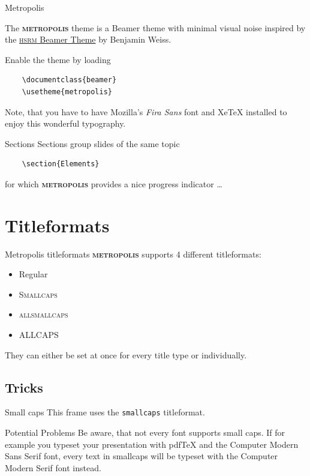 \documentclass[10pt]{beamer}
\newcommand{\themename}{\textbf{\textsc{metropolis}}\xspace}
\begin{document}
\begin{frame}[fragile]{Metropolis}

  The \themename theme is a Beamer theme with minimal visual noise
  inspired by the \href{https://github.com/hsrmbeamertheme/hsrmbeamertheme}{\textsc{hsrm} Beamer
  Theme} by Benjamin Weiss.

  Enable the theme by loading

  \begin{verbatim}    \documentclass{beamer}
    \usetheme{metropolis}\end{verbatim}

  Note, that you have to have Mozilla's \emph{Fira Sans} font and XeTeX
  installed to enjoy this wonderful typography.
\end{frame}
\begin{frame}[fragile]{Sections}
  Sections group slides of the same topic

  \begin{verbatim}    \section{Elements}\end{verbatim}

  for which \themename provides a nice progress indicator \ldots
  
\end{frame}

\section{Titleformats}

\begin{frame}{Metropolis titleformats}
	\themename supports 4 different titleformats:
	\begin{itemize}
		\item Regular
		\item \textsc{Smallcaps}
		\item \textsc{allsmallcaps}
		\item ALLCAPS
	\end{itemize}
	They can either be set at once for every title type or individually.
\end{frame}

\subsection{Tricks}

{
\begin{frame}{Small caps}
	This frame uses the \texttt{smallcaps} titleformat.

	\begin{alertblock}{Potential Problems}
		Be aware, that not every font supports small caps. If for example you typeset your presentation with pdfTeX and the Computer Modern Sans Serif font, every text in smallcaps will be typeset with the Computer Modern Serif font instead.
	\end{alertblock}
\end{frame}
}
\end{document}
